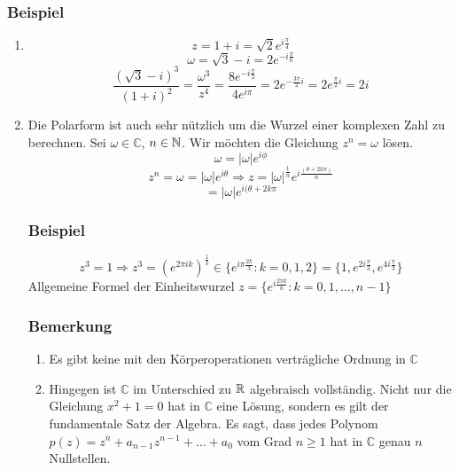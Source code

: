 \subsubsection*{Beispiel}
\begin{enumerate}
\item \[z=1+i=\sqrt{2}e^{i\frac{\pi}{4}}\]
\[\omega=\sqrt{3}-i=2e^{-i\frac{\pi}{6}}\]
\[\frac{\left(\sqrt{3}-i\right)^3}{(1+i)^2}=\frac{\omega^3}{z^4}=\frac{8e^{-i\frac{\pi}{2}}}{4e^{i\pi}}=2e^{-\frac{3\pi}{2}i}=2e^{\frac{\pi}{2}i}=2i\]
\item Die Polarform ist auch sehr nützlich um die Wurzel einer komplexen Zahl zu berechnen. Sei $\omega\in\mathbb{C}$, $n\in\mathbb{N}$. Wir möchten die Gleichung $z^n=\omega$ lösen.
\[\omega=\left|\omega\right| e^{i\phi}\]
\[z^n=\omega=\left|\omega\right| e^{i\theta}\Rightarrow z=\left| \omega\right|^\frac{1}{n}e^{i\frac{\left(\theta + 2k\pi\right)}{n}}\]
\[=\left| \omega\right| e^{i(\theta +2k\pi}\]
\subsubsection*{Beispiel}
\[z^3=1\Rightarrow z^3=\left( e^{2\pi i k}\right)^\frac{1}{3} \in \{e^{i\pi\frac{2k}{3}}: k=0,1,2\} = \{1,e^{2i\frac{\pi}{3}},e^{4i\frac{\pi}{3}} \}\]
Allgemeine Formel der Einheitswurzel $z=\{ e^{i\frac{2\pi k}{n}}:k=0,1,\dots,n-1\}$
\subsubsection*{Bemerkung}
\begin{enumerate}
\item Es gibt keine mit den Körperoperationen verträgliche Ordnung in $\mathbb{C}$
\item Hingegen ist $\mathbb{C}$ im Unterschied zu $\mathbb{R}$ algebraisch vollständig. Nicht nur die Gleichung $x^2+1=0$ hat in $\mathbb{C}$ eine Lösung, sondern es gilt der fundamentale Satz der Algebra. Es sagt, dass jedes Polynom $p(z)=z^n+a_{n-1}z^{n-1}+\dots+a_0$ vom Grad $n\geq 1$ hat in $\mathbb{C}$ genau $n$ Nullstellen.
\end{enumerate}
\end{enumerate}












